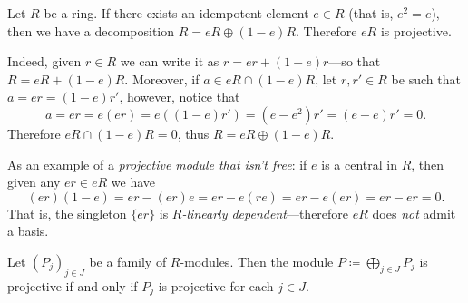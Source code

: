 \begin{example}
    \label{exp:idempotent-ring-projective}
    Let \(R\) be a ring. If there exists an idempotent element \(e \in R\) (that is,
    \(e^2 = e\)), then we have a decomposition \(R = e R \oplus (1 - e)
    R\). Therefore \(e R\) is projective.

    Indeed, given \(r \in R\) we can write it as \(r = e r + (1 - e) r\)---so that
    \(R = eR + (1 - e)R\). Moreover, if \(a \in eR \cap (1 - e)R\), let \(r, r' \in
    R\) be such that \(a = e r = (1 - e) r'\), however, notice that
    \[
        a = e r = e (e r) = e ((1 - e) r') = (e - e^2) r' = (e - e) r' = 0.
    \]
    Therefore \(e R \cap (1 - e) R = 0\), thus \(R = eR \oplus (1 - e)R\).

    As an example of a \emph{projective module that isn't free}: if \(e\) is a
    central in \(R\), then given any \(e r \in e R\) we have
    \[
        (e r) (1 - e) = e r - (e r) e = e r - e (r e) = e r - e (e r)
        = er - er = 0.
    \]
    That is, the singleton \(\{e r\}\) is \emph{\(R\)-linearly
        dependent}---therefore \(eR\) does \emph{not} admit a basis.
\end{example}

\begin{proposition}
    \label{prop:direct-sum-projective}
    Let \((P_j)_{j \in J}\) be a family of \(R\)-modules. Then the module
    \(P \coloneq \bigoplus_{j \in J} P_j\) is projective if and only if \(P_j\) is
    projective for each \(j \in J\).
\end{proposition}

